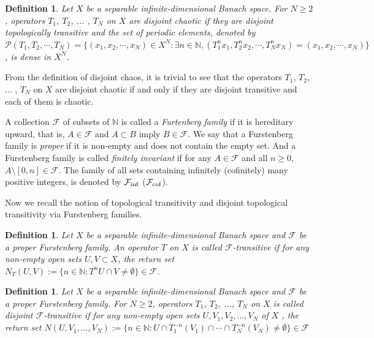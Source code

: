 \documentclass{article}
\newtheorem {definition}[theorem]{Definition}
\begin{document}
\begin{definition}\textnormal{\cite{CK23}
Let $X$ be a separable infinite-dimensional Banach space. For $N\geq2$, operators $T_{1}$, $T_{2}$, ... , $T_{N}$ on $X$ are \textit{disjoint chaotic} if they are disjoint topologically transitive and the set of periodic elements, denoted by $\mathcal{P}(T_{1}, T_{2}, \cdots, T_{N})=\{(x_{1},x_{2},\cdots,x_{N})\in X^{N}:\exists n\in\mathbb{N}, (T^{n}_{1}x_{1},T^{n}_{2}x_{2},\cdots,T^{n}_{N}x_{N})=(x_{1},x_{2},\cdots,x_{N})\}$, is dense in $X^{N}$.
}\end{definition}

From the definition of disjoint chaos, it is trivial to see that the operators $T_{1}$, $T_{2}$, ... , $T_{N}$ on $X$ are disjoint chaotic if and only if they are disjoint transitive and each of them is chaotic.

A collection $\mathcal{F}$ of subsets of $\mathbb{N}$ is called a \textit{Furtenberg family} if it is hereditary upward, that is, $A\in\mathcal{F}$ and $A\subset B$ imply $B\in \mathcal{F}$.
We say that a Furstenberg family is \textit{proper} if it is non-empty and does not contain the empty set.
And a Furstenberg family is called \textit{finitely invariant} if for any $A\in\mathcal{F}$ and all $n\geq 0$, $A\setminus [0,n]\in\mathcal{F}$.
The family of all sets containing infinitely (cofinitely) many positive integers, is denoted by $\mathcal{F}_{\rm inf}$ ($\mathcal{F}_{\rm cof}$).


Now we recall the notion of topological transitivity and disjoint topological transitivity via Furstenberg families.
\begin{definition}\textnormal{\cite{BMPP19}
Let $X$ be a separable infinite-dimensional Banach space and $\mathcal{F}$ be a proper Furstenberg family.
An  operator $T$ on $X$ is called \textit{$\mathcal{F}$-transitive} if for any non-empty open sets $U,V\subset X$, the return set $N_{T}(U,V):=\{n\in\mathbb{N}: T^{n}U\cap V\neq \emptyset\}\in \mathcal{F}$.
}\end{definition}

\begin{definition}\textnormal{ \cite{KBA22}
Let $X$ be a separable infinite-dimensional Banach space and $\mathcal{F}$ be a proper Furstenberg family.
For $N\geq 2$, operators $T_{1}$, $T_{2}$, ..., $T_{N}$ on $X$ is called \textit{disjoint $\mathcal{F}$-transitive} if for any non-empty open sets $U, V_{1}, V_{2},...,V_{N}$ of $X$ , the return set $N(U,V_{1}, ..., V_{N}) :=\{n\in\mathbb{N}: U\cap T^{-n}_{1}(V_{1})\cap\cdots\cap T^{-n}_{N}(V_{N})\neq \emptyset\}\in \mathcal{F}$
}\end{definition}
\end{document}
